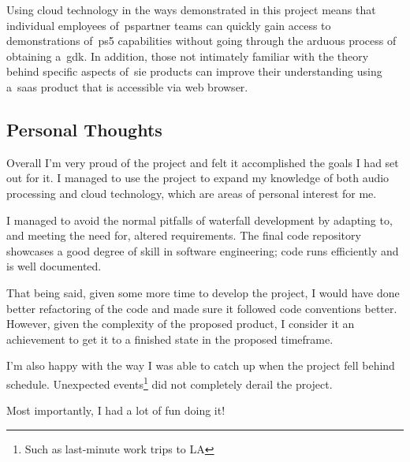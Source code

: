 Using cloud technology in the ways
demonstrated in this project means that individual employees of~\gls{pspartner} teams can quickly gain access to demonstrations of~\gls{ps5} capabilities without going through the arduous process
of obtaining a~\gls{gdk}.
In addition,
those not intimately familiar with the theory behind specific aspects of~\gls{sie} products can improve their understanding
using a~\gls{saas} product that is accessible via web browser.

\subsection{Personal Thoughts}\label{subsec:personal-thoughts}

Overall I'm very proud of the project and felt it accomplished the goals I had set out for it.
I managed to use the project to expand my knowledge of both audio processing and cloud technology,
which are areas of personal interest for me.

I managed to avoid the normal pitfalls of waterfall development by adapting to,
and meeting the need for, altered requirements.
The final code repository showcases a good degree of skill in software engineering;
code runs efficiently and is well documented.

That being said, given some more time to develop the project, I would have done better
refactoring of the code and made sure it followed code conventions better.
However, given the complexity of the proposed product,
I consider it an achievement to get it to a finished state in the proposed timeframe.

I'm also happy with the way I was able to catch up when the project fell behind schedule.
Unexpected events\footnote{Such as last-minute work trips to LA} did not completely derail the project.

Most importantly, I had a lot of fun doing it!